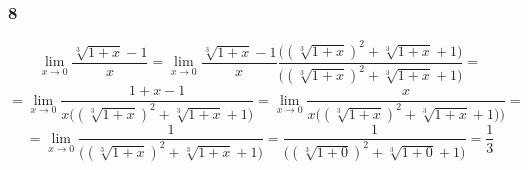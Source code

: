 \documentclass{article}
\begin{document}
\subsubsection*{8}

\begin{equation*}
    \lim_{x \to 0} \frac{\sqrt[3]{1+ x} - 1}{x} = \lim_{x \to 0} \frac{\sqrt[3]{1+ x} - 1}{x} \frac{\Bigg((\sqrt[3]{1+ x})^2 + \sqrt[3]{1+ x} + 1\Bigg)}{\Bigg((\sqrt[3]{1+ x})^2 + \sqrt[3]{1+ x} + 1\Bigg)} = 
\end{equation*}
\begin{equation*}
    = \lim_{x \to 0} \frac{1 + x - 1}{x \Big((\sqrt[3]{1+ x})^2 + \sqrt[3]{1+ x} + 1\Big)} = \lim_{x \to 0} \frac{x}{x \Big( (\sqrt[3]{1+ x})^2 + \sqrt[3]{1+ x} + 1)\Big)} =
\end{equation*}
\begin{equation*}
    = \lim_{x \to 0} \frac{1}{\Big( (\sqrt[3]{1+ x})^2 + \sqrt[3]{1+ x} + 1\Big)} = \frac{1}{\Big( (\sqrt[3]{1+ 0})^2 + \sqrt[3]{1+ 0} + 1\Big)} = \frac{1}{3}
\end{equation*}
\end{document}
